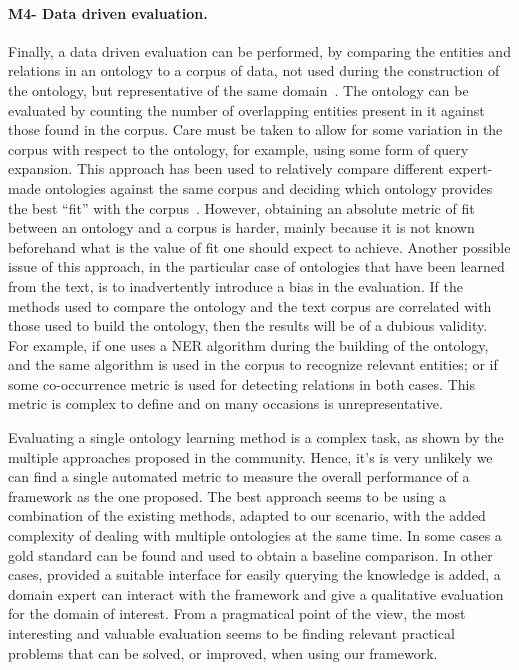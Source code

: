     \paragraph{M4- Data driven evaluation.}
    Finally, a data driven evaluation can be performed, by comparing the entities
    and relations in an ontology to a corpus of data, not used during the
    construction of the ontology, but representative of the same
    domain~\cite{brank2005survey}. The ontology can be evaluated by counting
    the number of overlapping entities present in it against those found in the corpus.
    Care must be taken to allow for some variation in the corpus with respect to
    the ontology, for example, using some form of query expansion.
    This approach has been used to relatively compare different expert-made
    ontologies against the same corpus and deciding which ontology provides
    the best ``fit'' with the corpus~\cite{brewster2004data}.
    However, obtaining an absolute metric of fit between an ontology and a
    corpus is harder, mainly because it is not known beforehand what is the
    value of fit one should expect to achieve.
    Another possible issue of this approach, in the particular case of
    ontologies that have been learned from the text, is to inadvertently
    introduce a bias in the evaluation. If the methods used to compare the
    ontology and the text corpus are correlated with those used to build the ontology,
    then the results will be of a dubious validity.
    For example, if one uses a NER algorithm during the building of the ontology,
    and the same algorithm is used in the corpus to recognize relevant entities;
    or if some co-occurrence metric is used for detecting relations in both cases.
    This metric is complex to define and on many occasions is unrepresentative.

    \vspace{1em}

    Evaluating a single ontology learning method is a complex task, as shown by the multiple approaches
    proposed in the community. Hence, it's is very unlikely we can find a single automated metric
    to measure the overall
    performance of a framework as the one proposed. The best approach seems to be using a combination of the
    existing methods, adapted to our scenario, with the added complexity of dealing with multiple ontologies
    at the same time. In some cases a gold standard can be found and used to obtain a baseline comparison. In
    other cases, provided a suitable interface for easily querying the knowledge is added, a domain expert can
    interact with the framework and give a qualitative evaluation for the domain of interest.
    From a pragmatical point of the view, the most interesting and valuable evaluation seems to be finding
    relevant practical problems that can be solved, or improved, when using our framework.

